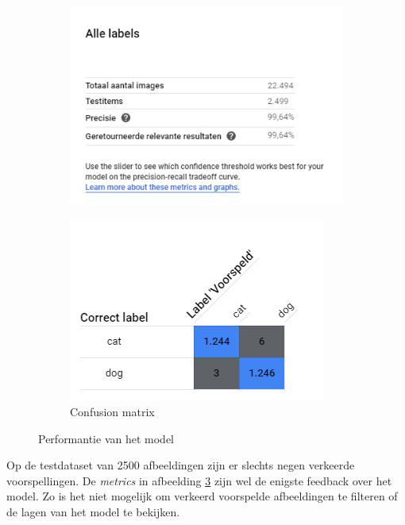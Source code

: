 \begin{figure}
    \begin{subfigure}{0.5\textwidth}
        \centering
        \includegraphics[width=0.8\linewidth]{img/google-automl-performance1.png}
        \caption{}
        \label{fig:google-performance1}
    \end{subfigure}
    \begin{subfigure}{0.5\textwidth}
        \centering
        \includegraphics[width=0.8\linewidth]{img/google-automl-performance12.png}
        \caption{Confusion matrix}
        \label{fig:google-performance2}
    \end{subfigure}
    \caption{Performantie van het model}
    \label{fig:google-performance}
\end{figure}

Op de testdataset van 2500 afbeeldingen zijn er slechts negen verkeerde voorspellingen. De \textit{metrics} in afbeelding \ref{fig:google-performance} zijn wel de enigste feedback over het model. Zo is het niet mogelijk om verkeerd voorspelde afbeeldingen te filteren of de lagen van het model te bekijken.

